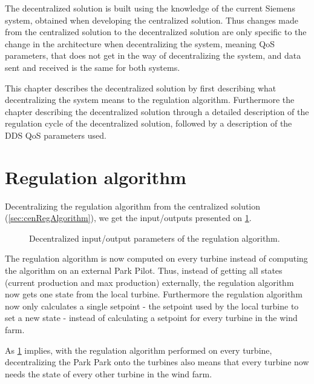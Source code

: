 \noindent The decentralized solution is built using the knowledge of the current Siemens system, obtained when developing the centralized solution. Thus changes made from the centralized solution to the decentralized solution are only specific to the change in the architecture when decentralizing the system, meaning QoS parameters, that does not get in the way of decentralizing the system, and data sent and received is the same for both systems.

This chapter describes the decentralized solution by first describing what decentralizing the system means to the regulation algorithm. Furthermore the chapter describing the decentralized solution through a detailed description of the regulation cycle of the decentralized solution, followed by a description of the DDS QoS parameters used. 

\section{Regulation algorithm}

Decentralizing the regulation algorithm from the centralized solution (\cref{sec:cenRegAlgorithm}), we get the input/outputs presented on \cref{fig:ioDecenRegAlg}.

\begin{figure}
	\centering
	

	\caption[Decentralized input/output parameters of the regulation algorithm]{
		\label{fig:ioDecenRegAlg} 
		\footnotesize{%
			Decentralized input/output parameters of the regulation algorithm.
		}
	}
\end{figure}

The regulation algorithm is now computed on every turbine instead of computing the algorithm on an external Park Pilot. Thus, instead of getting all states (current production and max production) externally, the regulation algorithm now gets one state from the local turbine. Furthermore the regulation algorithm now only calculates a single setpoint - the setpoint used by the local turbine to set a new state - instead of calculating a setpoint for every turbine in the wind farm.

As \cref{fig:ioDecenRegAlg} implies, with the regulation algorithm performed on every turbine, decentralizing the Park Park onto the turbines also means that every turbine now needs the state of every other turbine in the wind farm.

